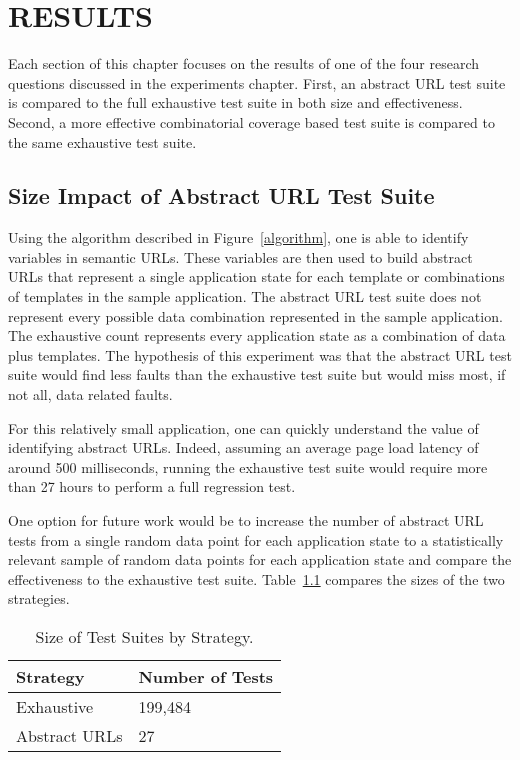 \chapter{\uppercase{RESULTS}}

Each section of this chapter focuses on the results of one of the four research questions discussed in the experiments chapter.  First, an abstract URL test suite is compared to the full exhaustive test suite in both size and effectiveness.  Second, a more effective combinatorial coverage based test suite is compared to the same exhaustive test suite.

\section{Size Impact of Abstract URL Test Suite}

Using the algorithm described in Figure~\ref{algorithm}, one is able to identify variables in semantic URLs.  These variables are then used to build abstract URLs that represent a single application state for each template or combinations of templates in the sample application.  The abstract URL test suite does not represent every possible data combination represented in the sample application.  The exhaustive count represents every application state as a combination of data plus templates.  The hypothesis of this experiment was that the abstract URL test suite would find less faults than the exhaustive test suite but would miss most, if not all, data related faults.

For this relatively small application, one can quickly understand the value of identifying abstract URLs.  Indeed, assuming an average page load latency of around 500 milliseconds, running the exhaustive test suite would require more than 27 hours to perform a full regression test.

One option for future work would be to increase the number of abstract URL tests from a single random data point for each application state to a statistically relevant sample of random data points for each application state and compare the effectiveness to the exhaustive test suite.  Table~\ref{table:reducedSize} compares the sizes of the two strategies.

\begin{table}[h]
	\centering
	\caption{Size of Test Suites by Strategy.}
	\begin{tabular}{| l | l |}
		\hline
  Strategy 					& 	Number of Tests		\\ \hline
  Exhaustive 				& 	199,484				\\ \hline
  Abstract URLs 			& 	27					\\
		\hline
	\end{tabular}
\label{table:reducedSize}
\end{table}

